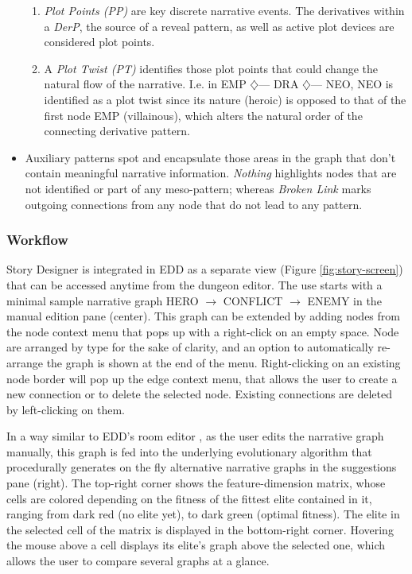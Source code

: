 \begin{itemize}
\begin{enumerate}
        \item \emph{Plot Points (PP)} are key discrete narrative events. The derivatives within a \textit{DerP}, the source of a reveal pattern, as well as active plot devices are considered plot points.
        \item A \emph{Plot Twist (PT)} identifies those plot points that could change the natural flow of the narrative. I.e. in EMP $\diamondsuit$--- DRA $\diamondsuit$--- NEO, NEO is identified as a plot twist since its nature (heroic) is opposed to that of the first node EMP (villainous), which alters the natural order of the connecting derivative pattern.
    \end{enumerate}
    \item Auxiliary patterns spot and encapsulate those areas in the graph that don't contain meaningful narrative information. \textit{Nothing} highlights nodes that are not identified or part of any meso-pattern; whereas \textit{Broken Link} marks outgoing connections from any node that do not lead to any pattern.
\end{itemize}



\subsubsection{Workflow}


Story Designer is integrated in EDD as a separate view (Figure \ref{fig:story-screen}) that can be accessed anytime from the dungeon editor. The use starts with a minimal sample narrative graph HERO $\rightarrow$ CONFLICT $\rightarrow$ ENEMY in the manual edition pane (center). This graph can be extended by adding nodes from the node context menu that pops up with a right-click on an empty space. Node are arranged by type for the sake of clarity, and an option to automatically re-arrange the graph is shown at the end of the menu. Right-clicking on an existing node border will pop up the edge context menu, that allows the user to create a new connection or to delete the selected node. Existing connections are deleted by left-clicking on them.

In a way similar to EDD's room editor \cite{p11alvarez_empowering_2019}, as the user edits the narrative graph manually, this graph is fed into the underlying evolutionary algorithm that procedurally generates on the fly alternative narrative graphs in the suggestions pane (right). The top-right corner shows the feature-dimension matrix, whose cells are colored depending on the fitness of the fittest elite contained in it, ranging from dark red (no elite yet), to dark green (optimal fitness). The elite in the selected cell of the matrix is displayed in the bottom-right corner. Hovering the mouse above a cell displays its elite's graph above the selected one, which allows the user to compare several graphs at a glance.    

